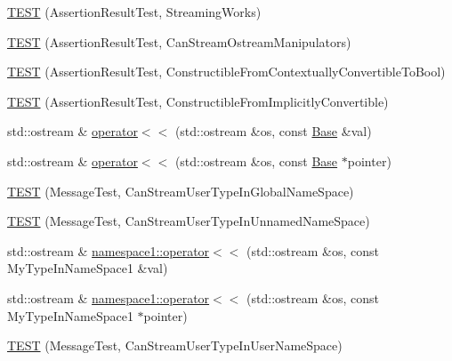 \begin{DoxyCompactItemize}
\item 
\mbox{\hyperlink{_obj__test_2lib_2googletest-master_2googletest_2test_2gtest__unittest_8cc_acdfdc68a5959b52a59f9dd0cccc3f390}{T\+E\+ST}} (Assertion\+Result\+Test, Streaming\+Works)
\item 
\mbox{\hyperlink{_obj__test_2lib_2googletest-master_2googletest_2test_2gtest__unittest_8cc_a9f44af0752c3f08c932e2750905c6d79}{T\+E\+ST}} (Assertion\+Result\+Test, Can\+Stream\+Ostream\+Manipulators)
\item 
\mbox{\hyperlink{_obj__test_2lib_2googletest-master_2googletest_2test_2gtest__unittest_8cc_a6c1aee92a8318b35de4f07970a737f5b}{T\+E\+ST}} (Assertion\+Result\+Test, Constructible\+From\+Contextually\+Convertible\+To\+Bool)
\item 
\mbox{\hyperlink{_obj__test_2lib_2googletest-master_2googletest_2test_2gtest__unittest_8cc_a4e5c52db04c25d8718f584bf5f74c62a}{T\+E\+ST}} (Assertion\+Result\+Test, Constructible\+From\+Implicitly\+Convertible)
\item 
std\+::ostream \& \mbox{\hyperlink{_obj__test_2lib_2googletest-master_2googletest_2test_2gtest__unittest_8cc_ab80209c07a91db303a9d415dc9bd4e81}{operator$<$$<$}} (std\+::ostream \&os, const \mbox{\hyperlink{class_base}{Base}} \&val)
\item 
std\+::ostream \& \mbox{\hyperlink{_obj__test_2lib_2googletest-master_2googletest_2test_2gtest__unittest_8cc_ac4fc0177334a6fd32b81376c9a2a2dc6}{operator$<$$<$}} (std\+::ostream \&os, const \mbox{\hyperlink{class_base}{Base}} $\ast$pointer)
\item 
\mbox{\hyperlink{_obj__test_2lib_2googletest-master_2googletest_2test_2gtest__unittest_8cc_a3cfb4c4e94683c4677706c53ab52fb8e}{T\+E\+ST}} (Message\+Test, Can\+Stream\+User\+Type\+In\+Global\+Name\+Space)
\item 
\mbox{\hyperlink{_obj__test_2lib_2googletest-master_2googletest_2test_2gtest__unittest_8cc_ab9dfac778014c6214ff30da9c74cbffe}{T\+E\+ST}} (Message\+Test, Can\+Stream\+User\+Type\+In\+Unnamed\+Name\+Space)
\item 
std\+::ostream \& \mbox{\hyperlink{namespacenamespace1_a469f00dab6318267fb48fab73226ca95}{namespace1\+::operator$<$$<$}} (std\+::ostream \&os, const My\+Type\+In\+Name\+Space1 \&val)
\item 
std\+::ostream \& \mbox{\hyperlink{namespacenamespace1_a9be9cab39b3a33a012040d70e1c86949}{namespace1\+::operator$<$$<$}} (std\+::ostream \&os, const My\+Type\+In\+Name\+Space1 $\ast$pointer)
\item 
\mbox{\hyperlink{_obj__test_2lib_2googletest-master_2googletest_2test_2gtest__unittest_8cc_ac87850465b99bd7121b521b2da5966f4}{T\+E\+ST}} (Message\+Test, Can\+Stream\+User\+Type\+In\+User\+Name\+Space)

\end{DoxyCompactItemize}
